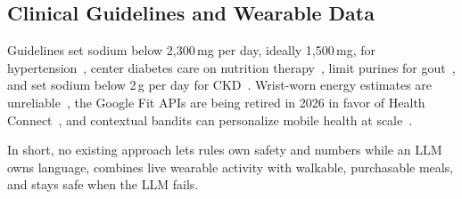 \subsection{Clinical Guidelines and Wearable Data}
Guidelines set sodium below 2{,}300\,mg per day, ideally 1{,}500\,mg, for
hypertension~\cite{jones2025hypertension}, center diabetes care on nutrition
therapy~\cite{ada2026standards}, limit purines for gout~\cite{fitzgerald2020gout},
and set sodium below 2\,g per day for CKD~\cite{kdigo2024ckd}.
Wrist-worn energy estimates are unreliable~\cite{germini2022wearable,
shcherbina2017wrist}, the Google Fit APIs are being retired in 2026 in favor of
Health Connect~\cite{android2025fitmigration}, and contextual bandits can
personalize mobile health at scale~\cite{lee2025pearl}.

In short, no existing approach lets rules own safety and numbers while an LLM
owns language, combines live wearable activity with walkable, purchasable
meals, and stays safe when the LLM fails.

